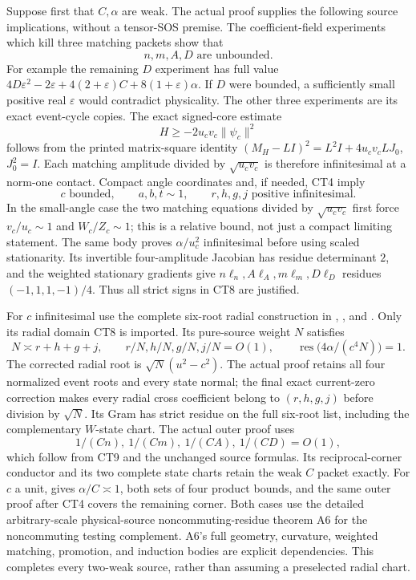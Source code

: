 Suppose first that \(C,\alpha\) are weak.  The actual proof
 supplies the following source implications,
without a tensor-SOS premise.  The coefficient-field experiments
which kill three matching packets show that
\[
                    n,m,A,D\text{ are unbounded}.             \tag{CT7}
\]
For example the remaining \(D\) experiment has full value
\(4D\varepsilon^2-2\varepsilon+4(2+\varepsilon)C
+8(1+\varepsilon)\alpha\).
If \(D\) were bounded, a sufficiently small positive real
\(\varepsilon\) would contradict physicality.  The other three
experiments are its exact event-cycle copies.
The exact signed-core estimate
\[
 H\geq-2u_cv_c\|\psi_c\|^2
\]
follows from the printed matrix-square identity
\((M_H-LI)^2=L^2I+4u_cv_cLJ_0\), \(J_0^2=I\).
Each matching amplitude divided by \(\sqrt{u_cv_c}\) is therefore
infinitesimal at a norm-one contact.  Compact angle coordinates
and, if needed, CT4 imply
\[
 c\text{ bounded},\qquad a,b,t\sim1,\qquad
 r,h,g,j\text{ positive infinitesimal}.                    \tag{CT8}
\]
In the small-angle case the two matching equations divided by
\(\sqrt{u_cv_c}\) first force \(v_c/u_c\sim1\) and \(W_c/Z_c\sim1\);
this is a relative bound, not just a compact limiting statement.
The same body proves \(\alpha/u_c^2\) infinitesimal before using
scaled stationarity.  Its invertible four-amplitude Jacobian has
residue determinant \(2\), and the weighted stationary gradients
give \(n\ell_n,A\ell_A,m\ell_m,D\ell_D\) residues
\((-1,1,1,-1)/4\).  Thus all strict signs in CT8 are justified.

For \(c\) infinitesimal use the complete six-root radial construction
in , , and
.  Only its radial domain CT8 is imported.
Its pure-source weight \(N\) satisfies
\[
 N\asymp r+h+g+j,\qquad
 r/N,h/N,g/N,j/N=O(1),\qquad
 \operatorname{res}\bigl(4\alpha/(c^4N)\bigr)=1.          \tag{CT9}
\]
The corrected radial root is \(\sqrt N(u^2-c^2)\).
The actual proof retains all four normalized event roots and every
state normal; the final exact current-zero correction makes every
radial cross coefficient belong to \((r,h,g,j)\) before division
by \(\sqrt N\).  Its Gram has strict residue on the full six-root
list, including the complementary \(W\)-state chart.
The actual outer proof 
uses
\[
             1/(Cn),\ 1/(Cm),\ 1/(CA),\ 1/(CD)=O(1),
\]
which follow from
CT9 and the unchanged source formulas.  Its reciprocal-corner
conductor and its two complete state charts retain the weak \(C\)
packet exactly.
For \(c\) a unit,  gives
\(\alpha/C\asymp1\), both sets of four product bounds, and the
same outer proof after CT4 covers the remaining corner.
Both cases use the detailed arbitrary-scale physical-source
noncommuting-residue theorem A6 for the noncommuting testing
complement.  A6's full geometry, curvature, weighted matching,
promotion, and induction bodies are explicit dependencies.
This completes every two-weak source, rather than assuming a
preselected radial chart.

